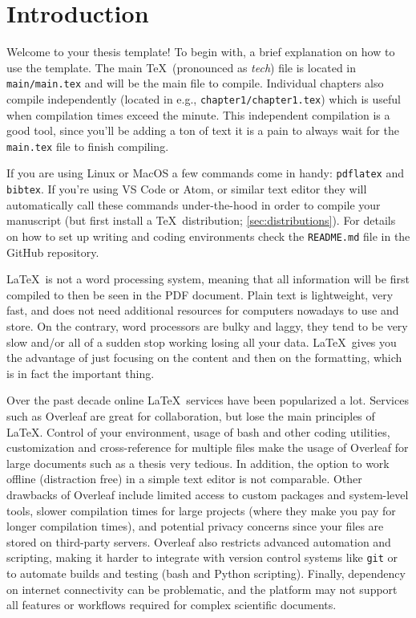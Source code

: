 
\chapter{Introduction}

Welcome to your thesis template! To begin with, a brief explanation on how to use the template. The main \TeX\ (pronounced as \textit{tech}) file is located in \texttt{main/main.tex} and will be the main file to compile. Individual chapters also compile independently (located in e.g., \texttt{chapter1/chapter1.tex}) which is useful when compilation times exceed the minute. This independent compilation is a good tool, since you'll be adding a ton of text it is a pain to always wait for the \texttt{main.tex} file to finish compiling.

If you are using Linux or MacOS a few commands come in handy: \texttt{pdflatex} and \texttt{bibtex}. If you're using VS Code or Atom, or similar text editor they will automatically call these commands under-the-hood in order to compile your manuscript (but first install a \TeX\ distribution; \cref{sec:distributions}). For details on how to set up writing and coding environments check the \texttt{README.md} file in the GitHub repository.

\LaTeX\ is not a word processing system, meaning that all information will be first compiled to then be seen in the PDF document. Plain text is lightweight, very fast, and does not need additional resources for computers nowadays to use and store. On the contrary, word processors are bulky and laggy, they tend to be very slow and/or all of a sudden stop working losing all your data. \LaTeX\ gives you the advantage of just focusing on the content and then on the formatting, which is in fact the important thing.

Over the past decade online \LaTeX\ services have been popularized a lot. Services such as Overleaf are great for collaboration, but lose the main principles of \LaTeX. Control of your environment, usage of bash and other coding utilities, customization and cross-reference for multiple files make the usage of Overleaf for large documents such as a thesis very tedious. In addition, the option to work offline (distraction free) in a simple text editor is not comparable.
%
Other drawbacks of Overleaf include limited access to custom packages and system-level tools, slower compilation times for large projects (where they make you pay for longer compilation times), and potential privacy concerns since your files are stored on third-party servers. Overleaf also restricts advanced automation and scripting, making it harder to integrate with version control systems like \texttt{git} or to automate builds and testing (bash and Python scripting). Finally, dependency on internet connectivity can be problematic, and the platform may not support all features or workflows required for complex scientific documents.

